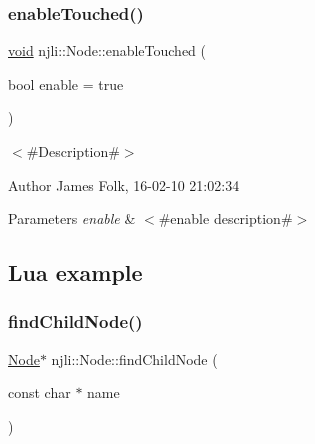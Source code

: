 \subsubsection{\texorpdfstring{enable\+Touched()}{enableTouched()}}
{\footnotesize\ttfamily \mbox{\hyperlink{_thread_8h_af1e856da2e658414cb2456cb6f7ebc66}{void}} njli\+::\+Node\+::enable\+Touched (\begin{DoxyParamCaption}\item[{bool}]{enable = {\ttfamily true} }\end{DoxyParamCaption})}



$<$\#\+Description\#$>$ 

\begin{DoxyAuthor}{Author}
James Folk, 16-\/02-\/10 21\+:02\+:34
\end{DoxyAuthor}

\begin{DoxyParams}{Parameters}
{\em enable} & $<$\#enable description\#$>$\\
\hline
\end{DoxyParams}
\hypertarget{classnjli_1_1_steering_behavior_wander_ex1}{}\subsection{Lua example}\label{classnjli_1_1_steering_behavior_wander_ex1}

\begin{DoxyCodeInclude}
\end{DoxyCodeInclude}
\mbox{\label{classnjli_1_1_node_af58461a0154d4e1281ea75ee5d553164}} 
\subsubsection{\texorpdfstring{find\+Child\+Node()}{findChildNode()}\hspace{0.1cm}{\footnotesize\ttfamily [1/2]}}
{\footnotesize\ttfamily \mbox{\hyperlink{classnjli_1_1_node}{Node}}$\ast$ njli\+::\+Node\+::find\+Child\+Node (\begin{DoxyParamCaption}\item[{const char $\ast$}]{name }\end{DoxyParamCaption})}



